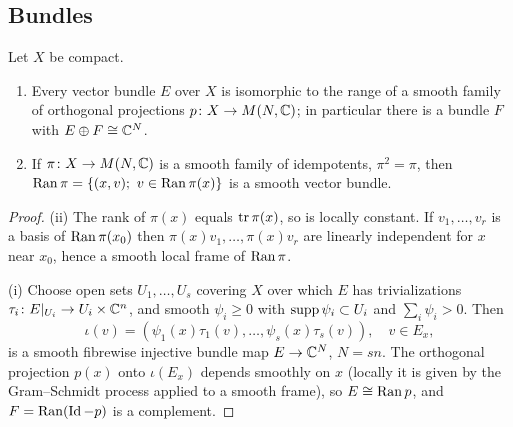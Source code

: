 \subsection{Bundles}
\begin{lemma}\label{bott:lem:bundles}
  Let $X$ be compact.
  \begin{enumerate}[label=(\roman*)]
  \item Every vector bundle $E$ over $X$ is isomorphic to the range of a smooth
    family of orthogonal projections $p\colon X\to M(N,\mathbb{C})$; in particular there
    is a bundle $F$ with $E\oplus F\cong\mathbb{C}^N$.
  \item If $\pi\colon X\to M(N,\mathbb{C})$ is a smooth family of idempotents, $\pi^2=\pi$,
    then $\Ran\pi=\{(x,v);\ v\in\Ran\pi(x)\}$ is a smooth vector bundle.
  \end{enumerate}
\end{lemma}
\begin{proof}
  (ii) The rank of $\pi(x)$ equals $\operatorname{tr}\pi(x)$, so is locally constant. If
  $v_1,\dots,v_r$ is a basis of $\operatorname{Ran}\pi(x_0)$ then $\pi(x)v_1,\dots,\pi(x)v_r$ are
  linearly independent for $x$ near $x_0$, hence a smooth local frame of $\operatorname{Ran}\pi$.

  (i) Choose open sets $U_1,\dots,U_s$ covering $X$ over which $E$ has trivializations
  $\tau_i\colon E|_{U_i}\to U_i\times\mathbb{C}^n$, and smooth $\psi_i\ge0$ with
  $\operatorname{supp}\psi_i\subset U_i$ and $\sum_i\psi_i>0$. Then
  \begin{equation*}
    \iota(v)=(\psi_1(x)\tau_1(v),\dots,\psi_s(x)\tau_s(v)),\quad v\in E_x,
  \end{equation*}
  is a smooth fibrewise injective bundle map $E\to\mathbb{C}^{N}$, $N=sn$. The orthogonal projection
  $p(x)$ onto $\iota(E_x)$ depends smoothly on $x$ (locally it is given by the
  Gram--Schmidt process applied to a smooth frame), so $E\cong\operatorname{Ran} p$, and
  $F=\operatorname{Ran}(\operatorname{Id}-p)$ is a complement.
\end{proof}

